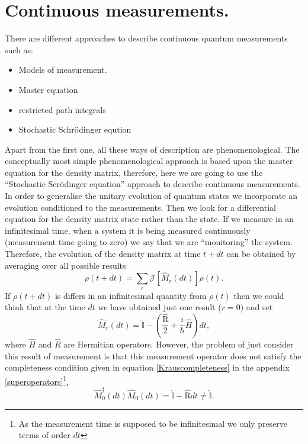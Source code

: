 \section{Continuous measurements.}
There are different approaches to describe continuous quantum measurements such as:
\begin{itemize}
\item Models of measurement.
\item Master equation
\item restricted path integrals
\item Stochastic Schr\"odinger eqution
\end{itemize}
Apart from the first one, all these ways of description are phenomenological. The conceptually most simple phenomenological approach is based upon the master equation for the density matrix, therefore, here we are going to use the ``Stochastic Scr\"odinger equation'' approach to describe continuous measurements\cite{jurgen}.\\
In order to generalise the unitary evolution of quantum states we incorporate an evolution conditioned to the measurements. Then we look for a differential equation for the density matrix state rather than the state. If we measure in an infinitesimal time, when a system it is being measured continuously (measurement time going to zero) we say that we are ``monitoring'' the system. Therefore, the evolution of the density matrix at time $t+dt$ can be obtained by averaging over all possible results
\begin{equation}
\rho(t+dt)=\sum_{r}\mathcal{J}[\hat{M}_{r}(dt)]\rho(t).
\label{quantumtrajectory1}
\end{equation}
If $\rho(t+dt)$ is differs in an infinitesimal quantity from $\rho(t)$ then we could think that at the time $dt$ we have obtained just one result ($r=0$) and set
\begin{equation}
\hat{M}_{r}(dt)=\hat{\mathbb{I}}-\left(\frac{\hat{\text{R}}}{2}+\frac{i}{\hbar}\hat{H}\right)dt,
\label{quantumtrajectory2}
\end{equation}
where $\hat{H}$ and $\hat{R}$ are Hermitian operators. However, the problem of just consider this result of measurement is that this measurement operator does not satisfy the completeness condition given in equation \eqref{Krauscompleteness} in the appendix \ref{superoperators}\footnote{As the measurement time is supposed to be infinitesimal we only preserve terms of order $dt$},
\[\hat{M}_{0}^{\dagger}(dt)\hat{M}_{0}(dt)=\hat{\mathbb{I}}-\hat{\text{R}}dt\neq \hat{\mathbb{I}}.\]
